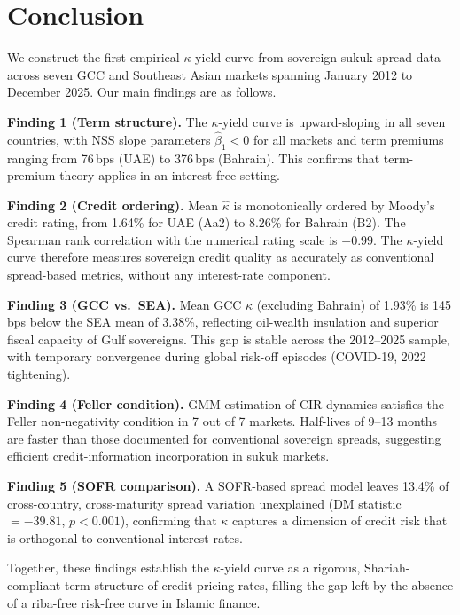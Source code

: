 \documentclass[12pt]{article}
\theoremstyle{plain}
\theoremstyle{definition}
\theoremstyle{remark}
\begin{document}
\section{Conclusion}
\label{sec:conclusion}

We construct the first empirical $\kappa$-yield curve from sovereign sukuk
spread data across seven GCC and Southeast Asian markets spanning January 2012
to December 2025. Our main findings are as follows.

\textbf{Finding 1 (Term structure).} The $\kappa$-yield curve is upward-sloping
in all seven countries, with NSS slope parameters $\hat{\beta}_1 < 0$ for all
markets and term premiums ranging from 76\,bps (UAE) to 376\,bps (Bahrain).
This confirms that term-premium theory applies in an interest-free setting.

\textbf{Finding 2 (Credit ordering).} Mean $\hat{\kappa}$ is monotonically
ordered by Moody's credit rating, from 1.64\% for UAE (Aa2) to 8.26\% for
Bahrain (B2). The Spearman rank correlation with the numerical rating scale
is $-0.99$. The $\kappa$-yield curve therefore measures sovereign credit
quality as accurately as conventional spread-based metrics, without any
interest-rate component.

\textbf{Finding 3 (GCC vs.\ SEA).} Mean GCC $\kappa$ (excluding Bahrain) of
1.93\% is 145\,bps below the SEA mean of 3.38\%, reflecting oil-wealth
insulation and superior fiscal capacity of Gulf sovereigns. This gap is stable
across the 2012--2025 sample, with temporary convergence during global risk-off
episodes (COVID-19, 2022 tightening).

\textbf{Finding 4 (Feller condition).} GMM estimation of CIR dynamics satisfies
the Feller non-negativity condition in 7 out of 7 markets. Half-lives of
9--13 months are faster than those documented for conventional sovereign spreads,
suggesting efficient credit-information incorporation in sukuk markets.

\textbf{Finding 5 (SOFR comparison).} A SOFR-based spread model leaves 13.4\%
of cross-country, cross-maturity spread variation unexplained (DM statistic
$= -39.81$, $p < 0.001$), confirming that $\kappa$ captures a dimension of
credit risk that is orthogonal to conventional interest rates.

Together, these findings establish the $\kappa$-yield curve as a rigorous,
Shariah-compliant term structure of credit pricing rates, filling the gap
left by the absence of a riba-free risk-free curve in Islamic finance.
\end{document}
